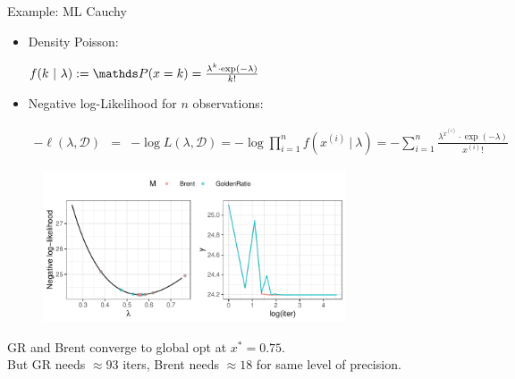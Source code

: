 \documentclass[11pt,compress,t,notes=noshow, xcolor=table]{beamer}
\begin{document}
\begin{vbframe}{Example: ML Cauchy}


\begin{itemize}
\item Density Poisson:
\begin{footnotesize}
$
f(k ~|~ \lambda) := \P(x = k) = \frac{\lambda^k \cdot \exp(-\lambda)}{k!}
$
\end{footnotesize}
\item Negative log-Likelihood for $n$ observations:
\begin{footnotesize}
\begin{eqnarray*}
- \ell(\lambda, \mathcal{D}) &=& - \log L(\lambda, \mathcal{D}) = - \log \prod_{i = 1}^n  f\left(x^{(i)} ~|~ \lambda\right) =  - \sum_{i = 1}^n \frac{\lambda^{x^{(i)} } \cdot \exp(-\lambda)}{x^{(i)} !} 
\end{eqnarray*}
\end{footnotesize}

\end{itemize}

\vspace*{-0.5cm}
\begin{figure}
  \includegraphics[width = 0.8\textwidth]{figure_man/poisson.pdf}
\end{figure}




 \footnotesize

GR and Brent converge to global opt at $x^\ast = 0.75$.\\But GR needs $\approx 93$ iters, Brent needs $\approx 18$ for same level of precision. 






\end{vbframe}
\end{document}
